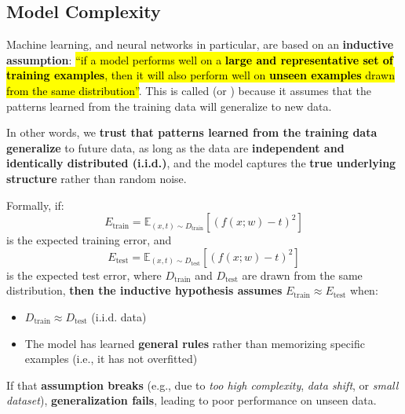 \subsection{Model Complexity}

Machine learning, and neural networks in particular, are based on an \textbf{inductive assumption}: \hl{``if a model performs well on a \textbf{large and representative set of training examples}, then it will also perform well on \textbf{unseen examples} drawn from the same distribution''}. This is called  (or ) because it assumes that the patterns learned from the training data will generalize to new data.

\highspace
In other words, we \textbf{trust that patterns learned from the training data generalize} to future data, as long as the data are \textbf{independent and identically distributed (i.i.d.)}, and the model captures the \textbf{true underlying structure} rather than random noise.

\highspace
Formally, if:
\begin{equation*}
    E_{\text{train}} = \mathbb{E}_{\left(x, t\right) \sim D_{\text{train}}} \left[\left(f(x; w) - t\right)^2\right]
\end{equation*}
is the expected training error, and
\begin{equation*}
    E_{\text{test}} = \mathbb{E}_{\left(x, t\right) \sim D_{\text{test}}} \left[\left(f(x; w) - t\right)^2\right]
\end{equation*}
is the expected test error, where \(D_{\text{train}}\) and \(D_{\text{test}}\) are drawn from the same distribution, \textbf{then the inductive hypothesis assumes} $E_{\text{train}} \approx E_{\text{test}}$ when:
\begin{itemize}
    \item $D_{\text{train}} \approx D_{\text{test}}$ (i.i.d. data)
    \item The model has learned \textbf{general rules} rather than memorizing specific examples (i.e., it has not overfitted)
\end{itemize}
If that \textbf{assumption breaks} (e.g., due to \emph{too high complexity}, \emph{data shift}, or \emph{small dataset}), \textbf{generalization fails}, leading to poor performance on unseen data.

